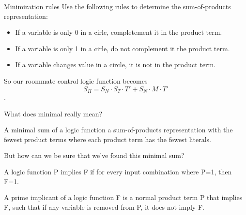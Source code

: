 \begin{frame}{Minimization rules}
  Use the following rules to determine the sum-of-products representation:
  \begin{itemize}
    \item If a variable is only 0 in a cirle, completement it in the product term.
    \item If a variable is only 1 in a cirle, do not complement it the product term.
    \item If a variable changes value in a circle, it is not in the product term.
  \end{itemize}
  So our roommate control logic function becomes $$S_H = S_N \cdot S_T \cdot T' + S_N \cdot M \cdot T'$$.
\end{frame}

\begin{frame}{What does minimal really mean?}
  \begin{definition}
    A \alert{minimal sum} of a logic function a sum-of-products representation with the fewest product terms where each product term has the fewest literals.
  \end{definition}
  But how can we be sure that we've found this minimal sum?
  \begin{definition}
    A logic function P \alert{implies} F if for every input combination where P=1, then F=1.
  \end{definition}
  \begin{definition}
    A \alert{prime implicant} of a logic function F is a normal product term P that implies F, such that if any variable is removed from P, it does not imply F.
  \end{definition}
\end{frame}

